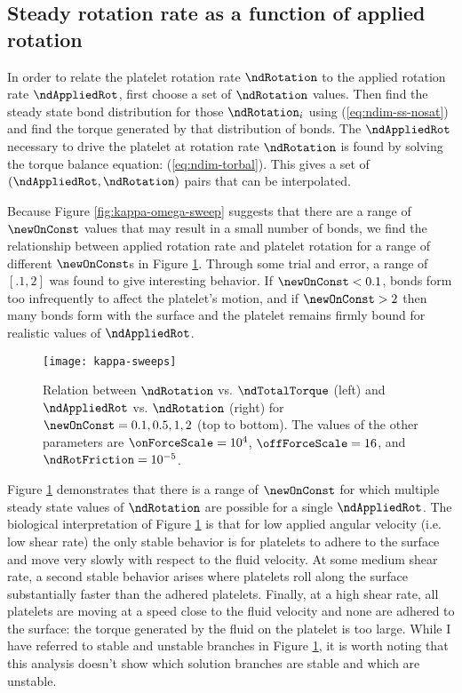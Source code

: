 \subsection{Steady rotation rate as a function of applied rotation}
\label{sec:rotation-vs-applied}

In order to relate the platelet rotation rate $\ndRotation$ to the
applied rotation rate $\ndAppliedRot$, first choose a set of
$\ndRotation$ values. Then find the steady state bond distribution for
those $\ndRotation_i$ using (\ref{eq:ndim-ss-nosat}) and find the
torque generated by that distribution of bonds. The $\ndAppliedRot$
necessary to drive the platelet at rotation rate $\ndRotation$ is
found by solving the torque balance equation:
(\ref{eq:ndim-torbal}). This gives a set of
$(\ndAppliedRot, \ndRotation)$ pairs that can be interpolated.

Because Figure \ref{fig:kappa-omega-sweep} suggests that there are a
range of $\newOnConst$ values that may result in a small number of
bonds, we find the relationship between applied rotation rate and
platelet rotation for a range of different $\newOnConst$s in Figure
\ref{fig:steady-states}. Through some trial and error, a range of
$[.1, 2]$ was found to give interesting behavior. If $\newOnConst <
0.1$, bonds form too infrequently to affect the platelet's motion, and
if $\newOnConst > 2$ then many bonds form with the surface and the
platelet remains firmly bound for realistic values of $\ndAppliedRot$.

\begin{figure}
  \centering
  \texttt{[image: kappa-sweeps]}
  \caption[Relation between $\ndRotation$ vs. $\ndTotalTorque$ and
  $\ndAppliedRot$ vs. $\ndRotation$ for varying
  $\newOnConst$.]{Relation between $\ndRotation$ vs. $\ndTotalTorque$
    (left) and $\ndAppliedRot$ vs. $\ndRotation$ (right) for
    $\newOnConst = 0.1, 0.5, 1, 2$ (top to bottom). The values of the
    other parameters are $\onForceScale = 10^4$,
    $\offForceScale = 16$, and $\ndRotFriction = 10^{-5}$.}
  \label{fig:steady-states}
\end{figure}

Figure \ref{fig:steady-states} demonstrates that there is a range of
$\newOnConst$ for which multiple steady state values of $\ndRotation$
are possible for a single $\ndAppliedRot$. The biological
interpretation of Figure \ref{fig:steady-states} is that for low
applied angular velocity (i.e. low shear rate) the only stable
behavior is for platelets to adhere to the surface and move very
slowly with respect to the fluid velocity. At some medium shear rate,
a second stable behavior arises where platelets roll along the surface
substantially faster than the adhered platelets. Finally, at a high
shear rate, all platelets are moving at a speed close to the fluid
velocity and none are adhered to the surface: the torque generated by
the fluid on the platelet is too large. While I have referred to
stable and unstable branches in Figure \ref{fig:steady-states}, it is
worth noting that this analysis doesn't show which solution branches
are stable and which are unstable.

